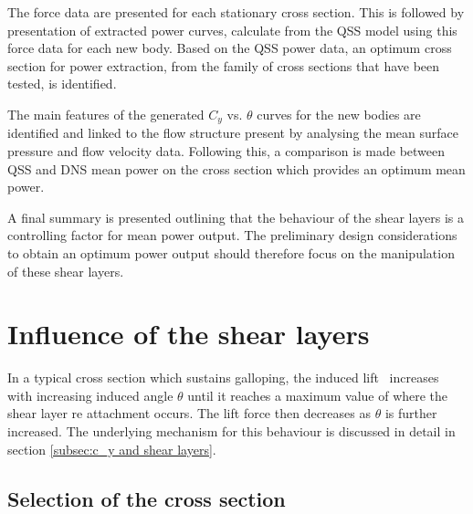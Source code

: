 The force data are presented for each stationary cross section. This is followed by presentation of extracted power curves, calculate from the QSS model using this force data for each new body. Based on the QSS power data, an optimum cross section for power extraction, from the family of cross sections that have been tested, is identified.

The main features of the generated $C_y$ vs. $\theta$ curves for the
new bodies are identified and linked to the flow structure present by
analysing the mean surface pressure and flow velocity data. Following
this, a comparison is made between QSS and DNS mean power on the cross
section which provides an optimum mean power.

A final summary is presented outlining that the behaviour of the shear layers is a controlling factor for mean power output. The preliminary design considerations to obtain an optimum power output should therefore focus on the manipulation of these shear layers. 





\section{Influence of the shear layers}

In a typical cross section which sustains galloping, the induced lift \cy\ increases with increasing induced angle $\theta$ until it reaches a maximum value of \cy where the shear layer re attachment occurs. The lift force then decreases as $\theta$ is further increased. The underlying mechanism for this behaviour is discussed in detail in section \ref{subsec:c_y and shear layers}.   

\subsection*{Selection of the cross section}







